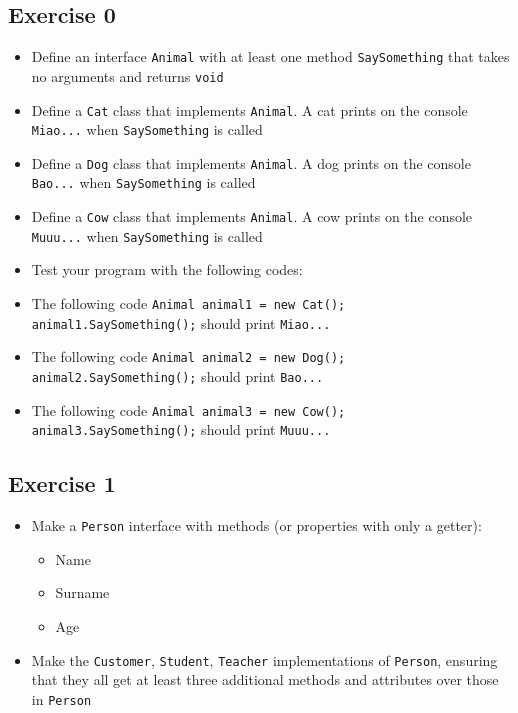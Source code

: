 		\subsection{Exercise 0}
	    \begin{itemize}
	    	\item Define an interface \texttt{Animal} with at least one method \texttt{SaySomething} that takes no arguments and returns \texttt{void}
	    	\item Define a \texttt{Cat} class that implements \texttt{Animal}. A cat prints on the console \texttt{Miao...} when \texttt{SaySomething} is called
	    	\item Define a \texttt{Dog} class that implements \texttt{Animal}. A dog prints on the console \texttt{Bao...} when \texttt{SaySomething} is called
	    	\item Define a \texttt{Cow} class that implements \texttt{Animal}. A cow prints on the console \texttt{Muuu...} when \texttt{SaySomething} is called
	    	\item[] Test your program with the following codes:
	    	\item The following code \texttt{Animal animal1 = new Cat(); animal1.SaySomething();} should print \texttt{Miao...}
	    	\item The following code \texttt{Animal animal2 = new Dog(); animal2.SaySomething();} should print \texttt{Bao...}
	    	\item The following code \texttt{Animal animal3 = new Cow(); animal3.SaySomething();} should print \texttt{Muuu...}
	    \end{itemize}
	    
    	\subsection{Exercise 1}
    	\begin{itemize}
    		\item Make a \texttt{Person} interface with methods (or properties with only a getter):
    		\begin{itemize}
    			\item Name
    			\item Surname
    			\item Age
    		\end{itemize}
    		
    		\item Make the \texttt{Customer}, \texttt{Student}, \texttt{Teacher} implementations of \texttt{Person}, ensuring that they all get at least three additional methods and attributes over those in \texttt{Person}
    	\end{itemize}
    	
